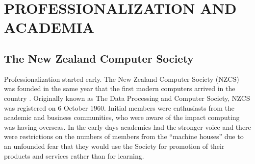 \documentclass{IEEEcsmag}
\begin{document}
\section{PROFESSIONALIZATION AND ACADEMIA}
\subsection{The New Zealand Computer Society}
\vspace*{5pt}
Professionalization started early. The New Zealand Computer Society (NZCS) was founded in the same year that the first modern computers arrived in the country \cite{Moon2010}.
Originally known as The Data Processing and Computer Society, NZCS was registered on 6 October 1960. Initial members were enthusiasts from the academic and business communities, who were aware of the impact computing was having overseas. In the early days academics had the stronger voice and there were restrictions on the numbers of members from the “machine houses” due to an
unfounded fear that they would use the Society for promotion of their products and services rather than for learning.
\end{document}
